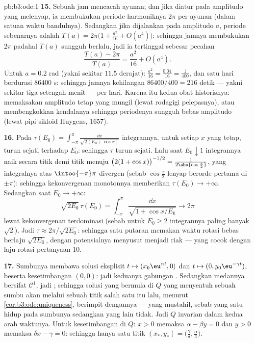 \begin{solution}{pb:b3:ode:1}
\textbf{15.} Sebuah jam mencacah ayunan; dan jika diatur pada amplitudo
yang melenyap, ia membukukan periode harmoniknya $2\pi$ per ayunan (dalam
satuan waktu bandulnya). Sedangkan jika dijalankan pada amplitudo $a$, periode
sebenarnya adalah $T(a) = 2\pi\bigl(1 + \frac{a^2}{16} +
O(a^4)\bigr)$: sehingga jamnya membukukan $2\pi$ padahal $T(a)$ sungguh
berlalu, jadi ia tertinggal sebesar pecahan
\[
\frac{T(a) - 2\pi}{T(a)} = \frac{a^2}{16} + O(a^4) .
\]
Untuk $a = 0.2$ rad (yakni sekitar $11.5$ derajat): $\frac{a^2}{16} =
\frac{0.04}{16} = \frac1{400}$, dan satu hari berdurasi $86400$ s: sehingga
jamnya kehilangan $86400/400 = 216$ detik --- yakni sekitar tiga setengah
menit --- per hari. Karena itu kedua obat historisnya:
memaksakan amplitudo tetap yang mungil (lewat rodagigi pelepasnya), atau membengkokkan
kendalanya sehingga periodenya sungguh bebas amplitudo
(lewat pipi sikloid Huygens, 1657).

\textbf{16.} Pada $\tau(E_0) = \int_{-\pi}^{\pi}\frac{\dd
x}{\sqrt{2(E_0 + \cos x)}}$ integrannya, untuk setiap
$x$ yang tetap, turun sejati terhadap $E_0$: sehingga $\tau$ turun
sejati. Lalu saat $E_0 \downarrow 1$ integrannya naik
secara titik demi titik menuju $\bigl(2(1 + \cos x)\bigr)^{-1/2} =
\frac1{2\abs{\cos\frac x2}}$, yang integralnya atas
$\intoo{-\pi}\pi$ divergen (sebab $\cos\frac x2$ lenyap berorde
pertama di $\pm\pi$): sehingga kekonvergenan monotonnya memberikan $\tau(E_0)
\to +\infty$. Sedangkan saat $E_0 \to +\infty$:
\[
\sqrt{2E_0}\,\tau(E_0) = \int_{-\pi}^{\pi}
\frac{\dd x}{\sqrt{1 + \cos x/E_0}} \longrightarrow 2\pi
\]
lewat kekonvergenan terdominasi (sebab untuk $E_0 \geq 2$ integrannya
paling banyak $\sqrt2$). Jadi $\tau \approx 2\pi/\sqrt{2E_0}$: sehingga satu
putaran memakan waktu rotasi bebas berlaju $\sqrt{2E_0}$,
dengan potensialnya menyusut menjadi riak --- yang cocok dengan laju rotasi
pertanyaan 10.

\textbf{17.} Sumbunya membawa solusi eksplisit $t
\mapsto (x_0\eu^{\alpha t}, 0)$ dan $t \mapsto (0,
y_0\eu^{-\gamma t})$, beserta kesetimbangan
$(0, 0)$: jadi keduanya gabungan . Sedangkan medannya bersifat $\mathcal
C^1$, jadi ; sehingga solusi yang bermula di $Q$
yang menyentuh sebuah sumbu akan melalui sebuah titik salah satu
 itu lalu, menurut \cref{cor:b3:ode:uniqueness}, berimpit
dengannya --- yang mustahil, sebab yang satu hidup pada sumbunya sedangkan yang lain
tidak. Jadi $Q$ invarian dalam kedua arah waktunya.
Untuk kesetimbangan di $Q$: $x > 0$ memaksa $\alpha - \beta y = 0$ dan
$y > 0$ memaksa $\delta x - \gamma = 0$: sehingga hanya satu titik
$(x_*, y_*) = \bigl(\frac\gamma\delta,
\frac\alpha\beta\bigr)$.


\end{solution}
